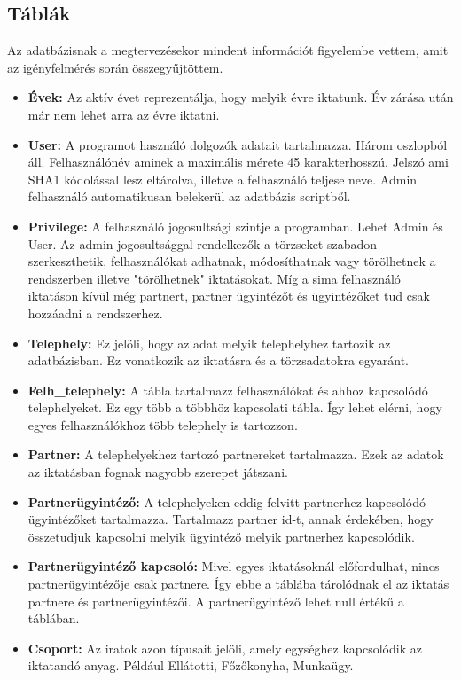\documentclass[
]{thesis-ekf}
\theoremstyle{definition}
\theoremstyle{remark}
\begin{document}
\subsection{Táblák}
Az adatbázisnak a megtervezésekor mindent információt figyelembe vettem, amit az igényfelmérés során összegyűjtöttem. 
\begin{itemize}[leftmargin=0pt]
\item[] \textbf{Évek: }	Az aktív évet reprezentálja, hogy melyik évre iktatunk. Év zárása után már nem lehet arra az évre iktatni.
\item[] \textbf{User: }	A programot használó dolgozók adatait tartalmazza. Három oszlopból áll. Felhasználónév aminek a maximális mérete 45 karakterhosszú. Jelszó ami SHA1 kódolással lesz eltárolva, illetve a felhasználó teljese neve. Admin felhasználó automatikusan belekerül az adatbázis scriptből.
\item[] \textbf{Privilege: }A felhasználó jogosultsági szintje a programban. Lehet Admin és User. Az admin jogosultsággal rendelkezők a törzseket szabadon szerkeszthetik, felhasználókat adhatnak, módosíthatnak vagy törölhetnek a rendszerben illetve "törölhetnek" iktatásokat. Míg a sima felhasználó iktatáson kívül még partnert, partner ügyintézőt és ügyintézőket tud csak hozzáadni a rendszerhez.
\item[] \textbf{Telephely: }Ez jelöli, hogy az adat melyik telephelyhez tartozik az adatbázisban. Ez vonatkozik az iktatásra és a törzsadatokra egyaránt.	
\item[] \textbf{Felh\_telephely: }A tábla tartalmazz felhasználókat és ahhoz kapcsolódó telephelyeket. Ez egy több a többhöz kapcsolati tábla. Így lehet elérni, hogy egyes felhasználókhoz több telephely is tartozzon.	
\item[] \textbf{Partner: }A telephelyekhez tartozó partnereket tartalmazza. Ezek az adatok az iktatásban fognak nagyobb szerepet játszani.
\item[] \textbf{Partnerügyintéző: }A telephelyeken eddig felvitt partnerhez kapcsolódó ügyintézőket tartalmazza. Tartalmazz partner id-t, annak érdekében, hogy összetudjuk kapcsolni melyik ügyintéző melyik partnerhez kapcsolódik.
\item[] \textbf{Partnerügyintéző kapcsoló: }Mivel egyes iktatásoknál előfordulhat, nincs partnerügyintézője csak partnere. Így ebbe a táblába tárolódnak el az iktatás partnere és partnerügyintézői. A partnerügyintéző lehet  null értékű a táblában.	
\item[] \textbf{Csoport: }Az iratok azon típusait jelöli, amely egységhez kapcsolódik az iktatandó anyag. Például Ellátotti, Főzőkonyha, Munkaügy.	

\end{itemize}
\end{document}
